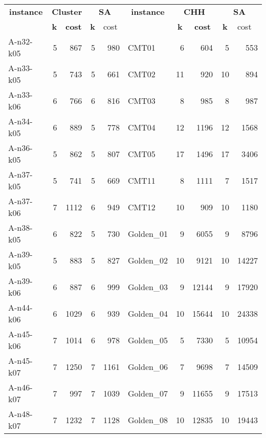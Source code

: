\begin{table}[!h]
    \footnotesize

    \begin{center}
    \begin{tabular}{|l|r|r|r|r|l|r|r|r|r|}
    \hline
    \multicolumn{ 1}{|c|}{\textbf{instance}} & \multicolumn{ 2}{c|}{\textbf{Cluster}} & \multicolumn{ 2}{c|}{\textbf{SA}} & \multicolumn{ 1}{c|}{\textbf{instance}} & \multicolumn{ 2}{c|}{\textbf{CHH}} & \multicolumn{ 2}{c|}{\textbf{SA}} \\ \cline{ 2- 5}\cline{ 7- 10}
    \multicolumn{ 1}{|c|}{} & \multicolumn{1}{c|}{\textbf{k}} & \multicolumn{1}{c|}{\textbf{cost}} & \multicolumn{1}{c|}{\textbf{k}} & \multicolumn{1}{l|}{cost} & \multicolumn{ 1}{c|}{} & \multicolumn{1}{c|}{\textbf{k}} & \multicolumn{1}{c|}{\textbf{cost}} & \multicolumn{1}{c|}{\textbf{k}} & \multicolumn{1}{l|}{cost} \\ \hline
    A-n32-k05 & 5 & 867 & 5 & 980 & CMT01 & 6 & 604 & 5 & 553 \\ \hline
    A-n33-k05 & 5 & 743 & 5 & 661 & CMT02 & 11 & 920 & 10 & 894 \\ \hline
    A-n33-k06 & 6 & 766 & 6 & 816 & CMT03 & 8 & 985 & 8 & 987 \\ \hline
    A-n34-k05 & 6 & 889 & 5 & 778 & CMT04 & 12 & 1196 & 12 & 1568 \\ \hline
    A-n36-k05 & 5 & 862 & 5 & 807 & CMT05 & 17 & 1496 & 17 & 3406 \\ \hline
    A-n37-k05 & 5 & 741 & 5 & 669 & CMT11 & 8 & 1111 & 7 & 1517 \\ \hline
    A-n37-k06 & 7 & 1112 & 6 & 949 & CMT12 & 10 & 909 & 10 & 1180 \\ \hline
    A-n38-k05 & 6 & 822 & 5 & 730 & Golden\_01 & 9 & 6055 & 9 & 8796 \\ \hline
    A-n39-k05 & 5 & 883 & 5 & 827 & Golden\_02 & 10 & 9121 & 10 & 14227 \\ \hline
    A-n39-k06 & 6 & 887 & 6 & 999 & Golden\_03 & 9 & 12144 & 9 & 17920 \\ \hline
    A-n44-k06 & 6 & 1029 & 6 & 939 & Golden\_04 & 10 & 15644 & 10 & 24338 \\ \hline
    A-n45-k06 & 7 & 1014 & 6 & 978 & Golden\_05 & 5 & 7330 & 5 & 10954 \\ \hline
    A-n45-k07 & 7 & 1250 & 7 & 1161 & Golden\_06 & 7 & 9698 & 7 & 14509 \\ \hline
    A-n46-k07 & 7 & 997 & 7 & 1039 & Golden\_07 & 9 & 11655 & 9 & 17513 \\ \hline
    A-n48-k07 & 7 & 1232 & 7 & 1128 & Golden\_08 & 10 & 12835 & 10 & 19443 \\ \hline

\end{tabular}
\end{center}
\end{table}
